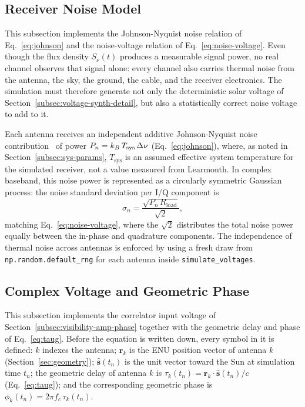 \subsection{Receiver Noise Model}
\label{subsec:noise-model}

This subsection implements the Johnson-Nyquist noise relation of
Eq.~\eqref{eq:johnson} and the noise-voltage relation of
Eq.~\eqref{eq:noise-voltage}. Even though the flux density $S_\nu(t)$
produces a measurable signal power, no real channel observes that signal
alone: every channel also carries thermal noise from the antenna, the sky,
the ground, the cable, and the receiver electronics. The simulation must
therefore generate not only the deterministic solar voltage of
Section~\ref{subsec:voltage-synth-detail}, but also a statistically correct
noise voltage to add to it.

Each antenna receives an independent additive Johnson-Nyquist noise
contribution~\citep{nyquist1928} of power $P_n = k_B\,T_{\rm sys}\,\Delta\nu$
(Eq.~\eqref{eq:johnson}), where, as noted in
Section~\ref{subsec:sys-params}, $T_\mathrm{sys}$ is an assumed effective
system temperature for the simulated receiver, not a value measured from
Learmonth. In complex baseband, this noise power is represented as a
circularly symmetric Gaussian process: the noise standard deviation per I/Q
component is
\begin{equation}
  \sigma_n = \frac{\sqrt{P_n\,R_{\mathrm{load}}}}{\sqrt{2}},
  \label{eq:noise-sigma}
\end{equation}
matching Eq.~\eqref{eq:noise-voltage}, where the $\sqrt{2}$ distributes the
total noise power equally between the in-phase and quadrature components.
The independence of thermal noise across antennas is enforced by using a
fresh draw from \texttt{np.random.default\_rng} for each antenna inside
\texttt{simulate\_voltages}.

\subsection{Complex Voltage and Geometric Phase}
\label{subsec:complex-voltage}

This subsection implements the correlator input voltage of
Section~\ref{subsec:visibility-amp-phase} together with the geometric delay
and phase of Eq.~\eqref{eq:taug}. Before the equation is written down, every
symbol in it is defined: $k$ indexes the antenna; $\bm{r}_k$ is the ENU
position vector of antenna $k$ (Section~\ref{sec:geometry}); $\hat{\bm{s}}(t_n)$
is the unit vector toward the Sun at simulation time $t_n$; the geometric
delay of antenna $k$ is $\tau_k(t_n)=\bm{r}_k\cdot\hat{\bm{s}}(t_n)/c$
(Eq.~\eqref{eq:taug}); and the corresponding geometric phase is
$\phi_k(t_n)=2\pi f_c\,\tau_k(t_n)$.


